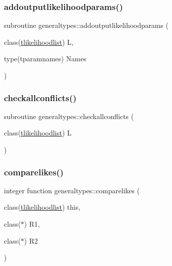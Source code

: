 \subsubsection{\texorpdfstring{addoutputlikelihoodparams()}{addoutputlikelihoodparams()}}
{\footnotesize\ttfamily subroutine generaltypes\+::addoutputlikelihoodparams (\begin{DoxyParamCaption}\item[{class(\mbox{\hyperlink{structgeneraltypes_1_1tlikelihoodlist}{tlikelihoodlist}})}]{L,  }\item[{type(tparamnames)}]{Names }\end{DoxyParamCaption})\hspace{0.3cm}{\ttfamily [private]}}

\mbox{\label{namespacegeneraltypes_a6d294b5c4431a0f7a6537529c66b98f1}} 
\subsubsection{\texorpdfstring{checkallconflicts()}{checkallconflicts()}}
{\footnotesize\ttfamily subroutine generaltypes\+::checkallconflicts (\begin{DoxyParamCaption}\item[{class(\mbox{\hyperlink{structgeneraltypes_1_1tlikelihoodlist}{tlikelihoodlist}})}]{L }\end{DoxyParamCaption})\hspace{0.3cm}{\ttfamily [private]}}

\mbox{\label{namespacegeneraltypes_aa824e634d28fc4010383a833af894aee}} 
\subsubsection{\texorpdfstring{comparelikes()}{comparelikes()}}
{\footnotesize\ttfamily integer function generaltypes\+::comparelikes (\begin{DoxyParamCaption}\item[{class(\mbox{\hyperlink{structgeneraltypes_1_1tlikelihoodlist}{tlikelihoodlist}})}]{this,  }\item[{class($\ast$)}]{R1,  }\item[{class($\ast$)}]{R2 }\end{DoxyParamCaption})\hspace{0.3cm}{\ttfamily [private]}}

